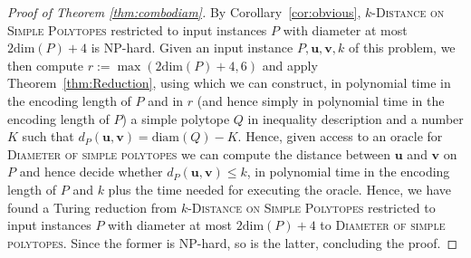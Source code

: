 \documentclass[centering,11pt,reqno]{amsart}
\theoremstyle{definition}
\newcommand{\NP}{\textsc{NP}}
\begin{document}
\begin{proof}[Proof of Theorem \ref{thm:combodiam}]
By Corollary~\ref{cor:obvious}, \textsc{$k$-Distance on Simple Polytopes} restricted to input instances $P$ with diameter at most $2\mathrm{dim}(P)+4$ is \NP-hard. Given an input instance $P,\mathbf{u},\mathbf{v}, k$ of this problem, we then compute $r:=\max(2\mathrm{dim}(P)+4,6)$ and apply Theorem~\ref{thm:Reduction}, using which we can construct, in polynomial time in the encoding length of $P$ and in $r$ (and hence simply in polynomial time in the encoding length of $P$) a simple polytope $Q$ in inequality description and a number $K$ such that $d_P(\mathbf{u},\mathbf{v})=\mathrm{diam}(Q)-K$. Hence, given access to an oracle for \textsc{Diameter of simple polytopes} we can compute the distance between $\mathbf{u}$ and $\mathbf{v}$ on $P$ and hence decide whether $d_P(\mathbf{u},\mathbf{v})\le k$, in polynomial time in the encoding length of $P$ and $k$ plus the time needed for executing the oracle. Hence, we have found a Turing reduction from \textsc{$k$-Distance on Simple Polytopes} restricted to input instances $P$ with diameter at most $2\mathrm{dim}(P)+4$ to \textsc{Diameter of simple polytopes}. Since the former is \NP-hard, so is the latter, concluding the proof.
\end{proof}




\end{document}
